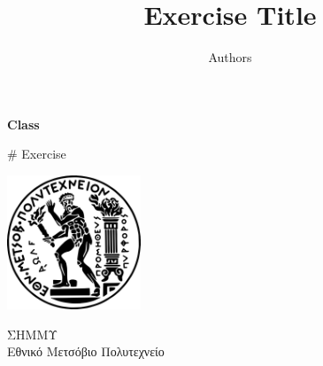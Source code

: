 \documentclass[12pt]{article}
\begin{document}
\author{\foreignlanguage{english}{Authors}}


\title{\foreignlanguage{english}{Exercise Title}}

\begin{titlepage}
    \begin{center}

        \Huge
        \textbf{\foreignlanguage{english}{Class}}

        \vspace{0.5cm}
        \LARGE
        \foreignlanguage{english}{\# Exercise}

        \vspace{0.3cm}
        {\vspace{-2em}\let\newpage\relax\maketitle\vspace{-2em}}

        \vspace{0.8cm}

        \includegraphics[width=0.3\textwidth]{logo.png}

        \vspace{0.8cm}
        \Large
        ΣΗΜΜΥ\\
        Εθνικό Μετσόβιο Πολυτεχνείο\\

    \end{center}
\end{titlepage}

\tableofcontents
\setcounter{page}{2}
\pagebreak
\end{document}
